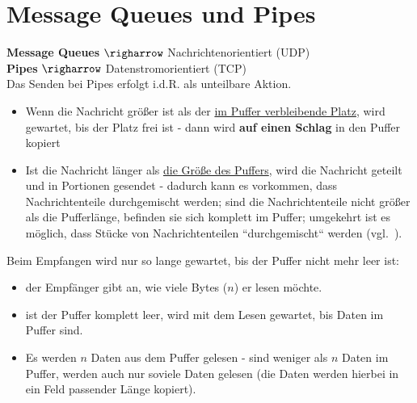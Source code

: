 \section{Message Queues und Pipes}

\textbf{Message Queues} $\righarrow$ Nachrichtenorientiert (UDP)\\

\noindent
\textbf{Pipes} $\righarrow$ Datenstromorientiert (TCP)\\

\noindent
Das Senden bei Pipes erfolgt i.d.R. als unteilbare Aktion.
\begin{itemize}
    \item Wenn die Nachricht größer ist als der \ul{im Puffer verbleibende Platz}, wird gewartet, bis der Platz frei ist - dann wird \textbf{auf einen Schlag} in den Puffer kopiert
    \item Ist die Nachricht länger als \ul{die Größe des Puffers}, wird die Nachricht geteilt und in Portionen gesendet - dadurch kann es vorkommen, dass Nachrichtenteile durchgemischt werden; sind die Nachrichtenteile nicht größer als die Pufferlänge, befinden sie sich komplett im Puffer;  umgekehrt ist es möglich, dass Stücke von Nachrichtenteilen ``durchgemischt`` werden (vgl.~\cite[117 f.]{Oec22}).
\end{itemize}

Beim Empfangen wird nur so lange gewartet, bis der Puffer nicht mehr leer ist:
\begin{itemize}
    \item der Empfänger gibt an, wie viele Bytes ($n$) er lesen möchte.
    \item ist der Puffer komplett leer, wird mit dem Lesen gewartet, bis Daten im Puffer sind.
    \item Es werden $n$ Daten aus dem Puffer gelesen - sind weniger als $n$ Daten im Puffer, werden auch nur soviele Daten gelesen (die Daten werden hierbei in ein Feld passender Länge kopiert).
\end{itemize}
